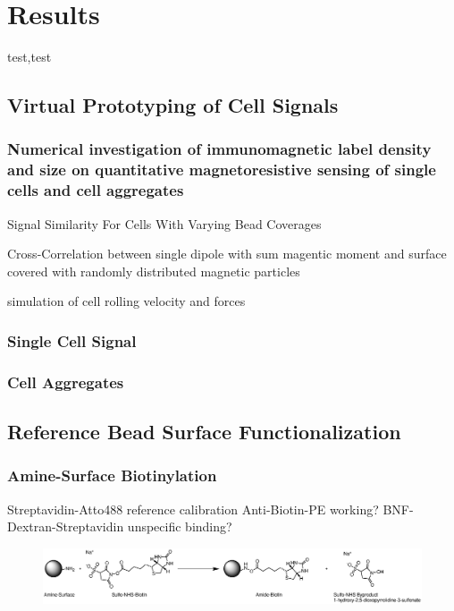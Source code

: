 \chapter{Results}
test,test

\section{Virtual Prototyping of Cell Signals}

\subsection{Numerical investigation of immunomagnetic label density and size on quantitative magnetoresistive sensing of single cells and cell aggregates}
Signal Similarity For Cells With Varying Bead Coverages

Cross-Correlation between single dipole with sum magentic moment and surface covered with randomly distributed magnetic particles

simulation of cell rolling velocity and forces

\subsection{Single Cell Signal}

\subsection{Cell Aggregates}

\section{Reference Bead Surface Functionalization}

\subsection{Amine-Surface Biotinylation}
Streptavidin-Atto488 reference calibration
Anti-Biotin-PE working?
BNF-Dextran-Streptavidin unspecific binding?



\begin{figure}[htb!]
	\centering
	\includegraphics[width=\textwidth]{./Ressources/Chemistry/Sulfo-NHS.eps}
	\label{fig:Chem:NH2-NHS}
\end{figure}





